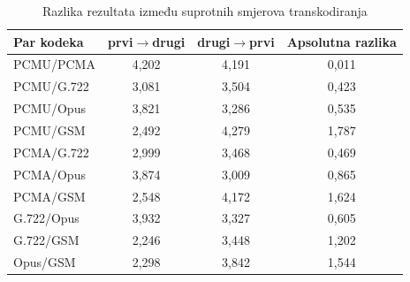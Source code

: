 \begin{table}[htbp]
\centering
\caption{Razlika rezultata između suprotnih smjerova transkodiranja}
\label{tab:directional-asymmetry}
\small
\begin{tabular}{|l|c|c|c|}
\hline
\textbf{Par kodeka} & \textbf{prvi$\rightarrow$drugi} & \textbf{drugi$\rightarrow$prvi} & \textbf{Apsolutna razlika} \\
\hline
PCMU/PCMA & 4,202 & 4,191 & 0,011 \\
PCMU/G.722 & 3,081 & 3,504 & 0,423 \\
PCMU/Opus & 3,821 & 3,286 & 0,535 \\
PCMU/GSM & 2,492 & 4,279 & 1,787 \\
PCMA/G.722 & 2,999 & 3,468 & 0,469 \\
PCMA/Opus & 3,874 & 3,009 & 0,865 \\
PCMA/GSM & 2,548 & 4,172 & 1,624 \\
G.722/Opus & 3,932 & 3,327 & 0,605 \\
G.722/GSM & 2,246 & 3,448 & 1,202 \\
Opus/GSM & 2,298 & 3,842 & 1,544 \\
\hline
\end{tabular}
\end{table}
